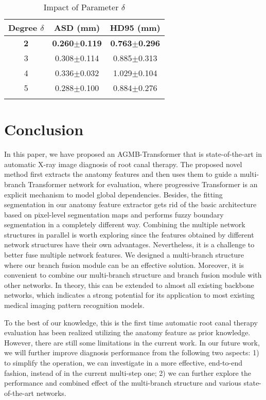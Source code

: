 \documentclass[journal]{IEEEtran}
\begin{document}
\begin{table}[ht]
\centering
\renewcommand\arraystretch{1.2}
\setlength{\tabcolsep}{3.0mm}
\caption{Impact of Parameter $\delta$}
\begin{tabular}{c|cc}
\Xhline{1pt}
Degree $\delta$ & ASD (mm) & HD95 (mm) \\ \hline
\textbf{2}      & \textbf{0.260$\pm$0.119 }   & \textbf{0.763$\pm$0.296 }    \\
3      & 0.308$\pm$0.114    & 0.885$\pm$0.313     \\
4      & 0.336$\pm$0.032     & 1.029$\pm$0.104   \\
5      & 0.288$\pm$0.100    & 0.884$\pm$0.276  \\\Xhline{1pt}
\end{tabular}
\label{tab:degree}
\end{table}

\section{Conclusion}
In this paper, we have proposed an AGMB-Transformer that is state-of-the-art in automatic X-ray image diagnosis of root canal therapy. The proposed novel method first extracts the anatomy features and then uses them to guide a multi-branch Transformer network for evaluation, where progressive Transformer is an explicit mechanism to model global dependencies. Besides, the fitting segmentation in our anatomy feature extractor gets rid of the basic architecture based on pixel-level segmentation maps and performs fuzzy boundary segmentation in a completely different way. Combining the multiple network structures in parallel is worth exploring since the features obtained by different network structures have their own advantages. Nevertheless, it is a challenge to better fuse multiple network features. We designed a multi-branch structure where our branch fusion module can be an effective solution. Moreover, it is convenient to combine our multi-branch structure and branch fusion module with other networks. In theory, this can be extended to almost all existing backbone networks, which indicates a strong potential for its application to most existing medical imaging pattern recognition models. 

To the best of our knowledge, this is the first time automatic root canal therapy evaluation has been realized utilizing the anatomy feature as prior knowledge. 
However, there are still some limitations in the current work.
In our future work, we will further improve diagnosis performance from the following two aspects: 1) to simplify the operation, we can investigate in a more effective, end-to-end fashion, instead of in the current multi-step one; 2) we can further explore the performance and combined effect of the multi-branch structure and various state-of-the-art networks.
\end{document}
